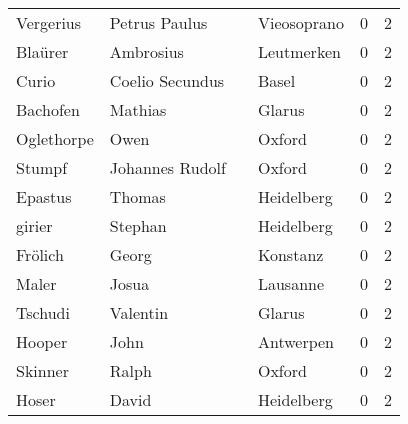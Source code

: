 \begin{center}
\begin{tiny}
\begin{longtabu}{llllrr}
                Vergerius &                      Petrus Paulus &             &                                 Vieosoprano &          0 &         2 \\
                  Blaürer &                          Ambrosius &             &                                  Leutmerken &          0 &         2 \\
                    Curio &                    Coelio Secundus &             &                                       Basel &          0 &         2 \\
                 Bachofen &                            Mathias &             &                                      Glarus &          0 &         2 \\
               Oglethorpe &                               Owen &             &                                      Oxford &          0 &         2 \\
                   Stumpf &                    Johannes Rudolf &             &                                      Oxford &          0 &         2 \\
                  Epastus &                             Thomas &             &                                  Heidelberg &          0 &         2 \\
                   girier &                            Stephan &             &                                  Heidelberg &          0 &         2 \\
                  Frölich &                              Georg &             &                                    Konstanz &          0 &         2 \\
                    Maler &                              Josua &             &                                    Lausanne &          0 &         2 \\
                  Tschudi &                           Valentin &             &                                      Glarus &          0 &         2 \\
                   Hooper &                               John &             &                                   Antwerpen &          0 &         2 \\
                  Skinner &                              Ralph &             &                                      Oxford &          0 &         2 \\
                    Hoser &                              David &             &                                  Heidelberg &          0 &         2 \\

\end{longtabu}
\end{tiny}
\end{center}
